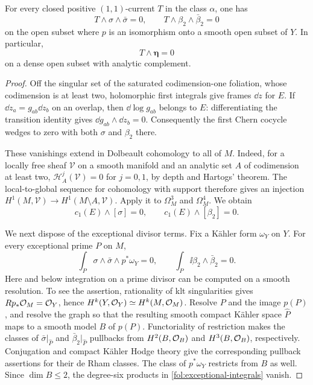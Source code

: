 \begin{lemma}\label{fol:annihilation}
For every closed positive $(1,1)$-current $T$ in the class $\alpha$, one has
\begin{equation}\label{fol:annihilations}
 T\wedge\sigma\wedge\bar\sigma=0,\qquad
 T\wedge\beta_2\wedge\bar\beta_2=0
\end{equation}
on the open subset where $p$ is an isomorphism onto a smooth open subset
of $Y$.  In particular,
\begin{equation}\label{fol:T-eta}
 T\wedge\boldsymbol\eta=0
\end{equation}
on a dense open subset with analytic complement.
\end{lemma}

\begin{proof}
Off the singular set of the saturated codimension-one foliation, whose
codimension is at least two, holomorphic first integrals give frames
$\dd z$ for $E$.  If $\dd z_a=g_{ab}\dd z_b$ on an overlap, then
$\dd\log g_{ab}$ belongs to $E$: differentiating the transition identity
gives $\dd g_{ab}\wedge\dd z_b=0$.  Consequently the first Chern cocycle
wedges to zero with both $\sigma$ and $\beta_2$ there.

These vanishings extend in Dolbeault cohomology to all of $M$.  Indeed,
for a locally free sheaf $\mathcal V$ on a smooth manifold and an analytic
set $A$ of codimension at least two,
$\mathcal H^j_A(\mathcal V)=0$ for $j=0,1$, by depth and Hartogs'
theorem.  The local-to-global sequence for cohomology with support
therefore gives an injection
$H^1(M,\mathcal V)\to H^1(M\setminus A,\mathcal V)$.
Apply it to $\Omega_M^3$ and $\Omega_M^4$.  We obtain
\begin{equation}\label{fol:Bott-Chern}
 c_1(E)\wedge[\sigma]=0,\qquad
 c_1(E)\wedge[\beta_2]=0.
\end{equation}

We next dispose of the exceptional divisor terms.  Fix a K\"ahler form
$\omega_Y$ on $Y$.  For every exceptional prime $P$ on $M$,
\begin{equation}\label{fol:exceptional-integrals}
 \int_P \sigma\wedge\bar\sigma\wedge p^*\omega_Y=0,\qquad
 \int_P \ii\beta_2\wedge\bar\beta_2=0.
\end{equation}
Here and below integration on a prime divisor can be computed on a
smooth resolution.  To see the assertion, rationality of klt
singularities gives $Rp_*\mathcal{O}_M=\mathcal{O}_Y$, hence
$H^k(Y,\mathcal{O}_Y)\simeq H^k(M,\mathcal{O}_M)$.  Resolve $P$ and the image $p(P)$,
and resolve the graph so that the resulting smooth compact K\"ahler
space $\widehat P$ maps to a smooth model $B$ of $p(P)$.  Functoriality
of restriction makes the classes of $\bar\sigma|_{\widehat P}$ and
$\bar\beta_2|_{\widehat P}$ pullbacks from $H^2(B,\mathcal{O}_B)$ and
$H^3(B,\mathcal{O}_B)$, respectively.  Conjugation and compact K\"ahler Hodge
theory give the corresponding pullback assertions for their de Rham
classes.  The class of $p^*\omega_Y$ restricts from $B$ as well.
Since $\dim B\leq2$, the degree-six products in
\eqref{fol:exceptional-integrals} vanish.


\end{proof}

